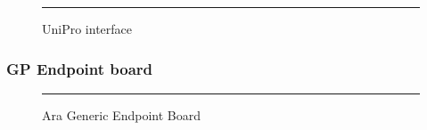 \begin{figure}[htbp]
  \centering
    \rule{35em}{0.5pt}
  \caption[UniPro interface]{UniPro interface}
  \label{fig:endo}
\end{figure}

\subsubsection{GP Endpoint board}

\begin{figure}[htbp]
  \centering
    \rule{35em}{0.5pt}
  \caption[Ara Generic Endpoint Board]{Ara Generic Endpoint Board}
  \label{fig:gpendpoint}
\end{figure}


